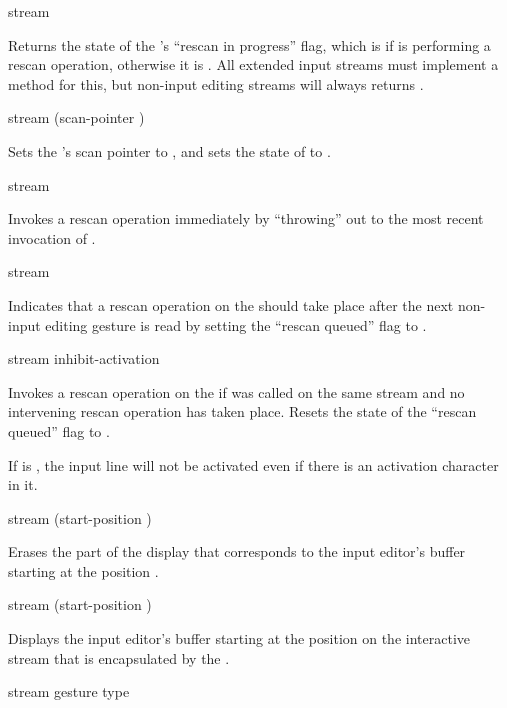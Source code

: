  {stream}

Returns the state of the  's ``rescan in
progress'' flag, which is  if  is performing a rescan
operation, otherwise it is .  All extended input streams must
implement a method for this, but non-input editing streams will always returns
.

 {stream \optional (scan-pointer )}

Sets the  's scan pointer to
, and sets the state of  to
.

 {stream}

Invokes a rescan operation immediately by ``throwing'' out to the most recent
invocation of .

 {stream}

Indicates that a rescan operation on the 
 should take place after the next non-input editing gesture is read
by setting the ``rescan queued'' flag to .

 {stream \optional inhibit-activation} 

Invokes a rescan operation on the   if
 was called on the same stream and no intervening rescan
operation has taken place.  Resets the state of the ``rescan queued'' flag to
.

If  is , the input line will not be
activated even if there is an activation character in it.

 {stream \optional (start-position )}

Erases the part of the display that corresponds to the input editor's buffer
starting at the position .

 {stream \optional (start-position )}

Displays the input editor's buffer starting at the position 
on the interactive stream that is encapsulated by the  .


 {stream gesture type}

